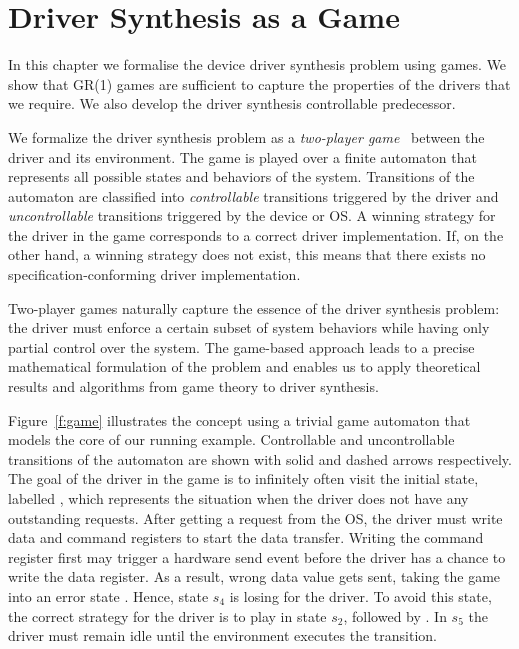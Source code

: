 \chapter{Driver Synthesis as a Game}

In this chapter we formalise the device driver synthesis problem using games. We show that GR(1) games are sufficient to capture the properties of the drivers that we require. We also develop the driver synthesis controllable predecessor.

We formalize the driver synthesis problem as a \emph{two-player game}~\cite{Thomas_95} between the driver and its environment. The game is played over a finite automaton that represents all possible states and behaviors of the system. Transitions of the automaton are classified into \emph{controllable} transitions triggered by the driver and \emph{uncontrollable} transitions triggered by the device or OS. A winning strategy for the driver in the game corresponds to a correct driver implementation. If, on the other hand, a winning strategy does not exist, this means that there exists no specification-conforming driver implementation.

Two-player games naturally capture the essence of the driver synthesis problem: the driver must enforce a certain subset of system behaviors while having only partial control over the system. The game-based approach leads to a precise mathematical formulation of the problem and enables us to apply theoretical results and algorithms from game theory to driver synthesis.

Figure~\ref{f:game} illustrates the concept using a trivial game automaton that models the core of our running example. Controllable and uncontrollable transitions of the automaton are shown with solid and dashed arrows respectively.  The goal of the driver in the game is to infinitely often visit the initial state, labelled , which represents the situation when the driver does not have any outstanding requests.  After getting a  request from the OS, the driver must write data and command registers to start the data transfer.  Writing the command register first may trigger a hardware send event before the driver has a chance to write the data register.  As a result, wrong data value gets sent, taking the game into an error state .  Hence, state $s_4$ is losing for the driver.  To avoid this state, the correct strategy for the driver is to play  in state $s_2$, followed by .  In $s_5$ the driver must remain idle until the environment executes the  transition.

